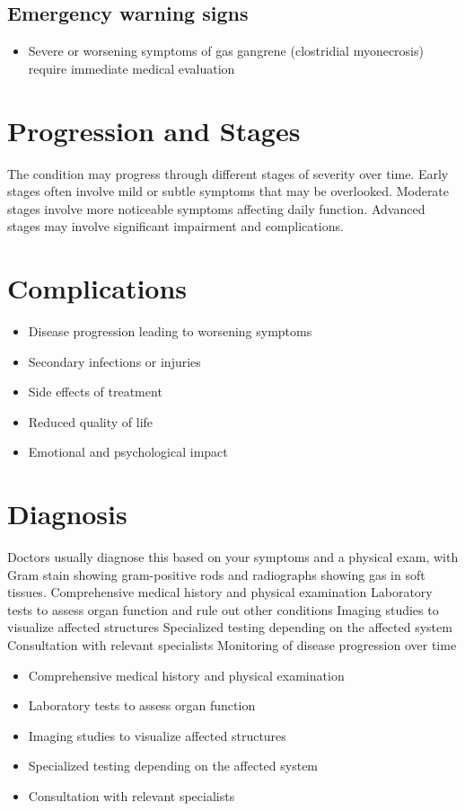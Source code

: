 \subsection{Emergency warning signs}
\begin{itemize}[noitemsep]
  \item Severe or worsening symptoms of gas gangrene (clostridial myonecrosis) require immediate medical evaluation
\end{itemize}
\section{Progression and Stages}
The condition may progress through different stages of severity over time. Early stages often involve mild or subtle symptoms that may be overlooked. Moderate stages involve more noticeable symptoms affecting daily function. Advanced stages may involve significant impairment and complications.
\section{Complications}
\begin{itemize}[noitemsep]
  \item Disease progression leading to worsening symptoms
  \item Secondary infections or injuries
  \item Side effects of treatment
  \item Reduced quality of life
  \item Emotional and psychological impact
\end{itemize}
\section{Diagnosis}
Doctors usually diagnose this based on your symptoms and a physical exam, with Gram stain showing gram-positive rods and radiographs showing gas in soft tissues. Comprehensive medical history and physical examination Laboratory tests to assess organ function and rule out other conditions Imaging studies to visualize affected structures Specialized testing depending on the affected system Consultation with relevant specialists Monitoring of disease progression over time

\begin{itemize}[noitemsep]
  \item Comprehensive medical history and physical examination
  \item Laboratory tests to assess organ function
  \item Imaging studies to visualize affected structures
  \item Specialized testing depending on the affected system
  \item Consultation with relevant specialists
\end{itemize}
